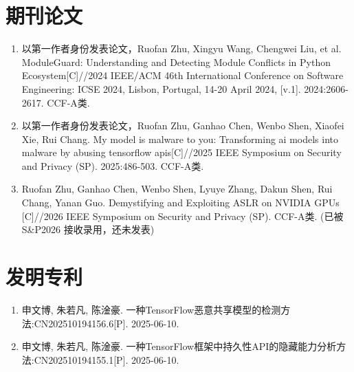 {%
    \section*{期刊论文}
    \begin{enumerate}
        \item 以第一作者身份发表论文，Ruofan Zhu, Xingyu Wang, Chengwei Liu, et al. ModuleGuard: Understanding and Detecting Module Conflicts in Python Ecosystem[C]//2024 IEEE/ACM 46th International Conference on Software Engineering: ICSE 2024, Lisbon, Portugal, 14-20 April 2024, [v.1]. 2024:2606-2617. CCF-A类.
        \item 以第一作者身份发表论文，Ruofan Zhu, Ganhao Chen, Wenbo Shen, Xiaofei Xie, Rui Chang. My model is malware to you: Transforming ai models into malware by abusing tensorflow apis[C]//2025 IEEE Symposium on Security and Privacy (SP). 2025:486-503. CCF-A类.
        \item Ruofan Zhu, Ganhao Chen, Wenbo Shen, Lyuye Zhang, Dakun Shen, Rui Chang, Yanan Guo. Demystifying and Exploiting ASLR on NVIDIA GPUs [C]//2026 IEEE Symposium on Security and Privacy (SP). CCF-A类. (已被 S\&P2026 接收录用，还未发表)
    \end{enumerate}

    \section*{发明专利}
    \begin{enumerate}
        \item 申文博, 朱若凡, 陈淦豪. 一种TensorFlow恶意共享模型的检测方法:CN202510194156.6[P]. 2025-06-10.
        \item 申文博, 朱若凡, 陈淦豪. 一种TensorFlow框架中持久性API的隐藏能力分析方法:CN202510194155.1[P]. 2025-06-10.
    \end{enumerate}
}